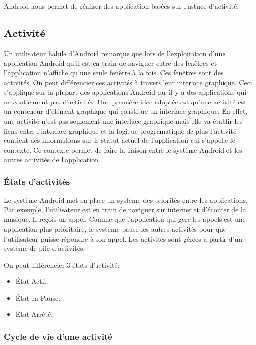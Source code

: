 Android nous permet de réaliser des application basées sur l'astuce d'activité.

\subsection{Activité}

Un utilisateur habile d'Android remarque que lors de l'exploitation d'une
application Android qu'il est en train de naviguer entre des fenêtres et
l'application n'affiche qu'une seule fenêtre à la fois. Ces fenêtres sont des
activités. On peut différencier ces activités à travers leur interface
graphique. Ceci s'applique sur la plupart des applications Android car il y a
des applications qui ne contiennent pas d'activités. Une première idée adoptée
est qu'une activité est un conteneur d'élément graphique qui constitue un
interface graphique. En effet, une activité n'est pas seulement une interface
graphique mais elle va établir les liens entre l'interface graphique et la
logique programatique de plus l'activité contient des informations sur le
statut actuel de l'application qui s'appelle le contexte. Ce contexte permet de
faire la liaison entre le système Android et les autres activités de
l'application.

\subsubsection{États d'activités}

Le système Android met en place un système des priorités entre les
applications.  Par exemple, l'utilisateur est en train de naviguer sur internet
et d'écouter de la musique. Il reçois un appel. Comme que l'application qui
gère les appels est une application plus prioritaire, le système pause les
autres activités pour que l'utilisateur puisse répondre à son appel. Les
activités sont gérées à partir d'un système de pile d'activités.

On peut différencier 3 états d'activité:

\begin{itemize}
    \item État Actif.
    \item État en Pause.
    \item État Arrêté.
\end{itemize}

\subsubsection{Cycle de vie d'une activité}

